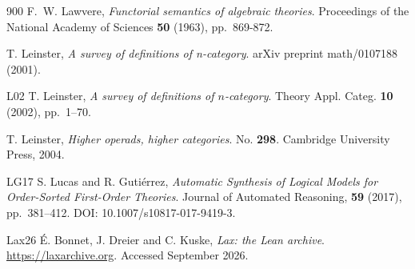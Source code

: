 \begin{thebibliography}{900}
F.~W. Lawvere, \emph{Functorial semantics of algebraic theories}. Proceedings of the National Academy of Sciences \textbf{50} (1963), pp.~869-872.


T. Leinster, \emph{A survey of definitions of n-category}. arXiv preprint math/0107188 (2001).

\bibitem%
{L02} T. Leinster, \emph{A survey of definitions of $n$-category}. Theory Appl. Categ. \textbf{10} (2002), pp.~1--70.

T. Leinster, \emph{Higher operads, higher categories}. No. \textbf{298}. Cambridge University Press, 2004.

\bibitem%
{LG17} S. Lucas and R. Guti\'{e}rrez, \emph{Automatic Synthesis of Logical Models for Order-Sorted First-Order Theories}. Journal of Automated Reasoning, \textbf{59} (2017), pp.~381--412. DOI: 10.1007/s10817-017-9419-3.




%

\bibitem%
{Lax26} \'{E}. Bonnet, J. Dreier and C. Kuske, \emph{Lax: the Lean archive}. \url{https://laxarchive.org}. Accessed September 2026.


\end{thebibliography}
